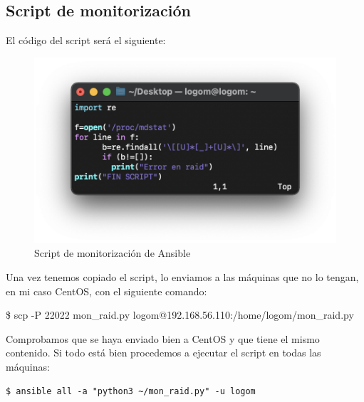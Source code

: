 \subsection{Script de monitorización}
El código del script será el siguiente:
    \begin{figure}[H]
        \centering
        \includegraphics[scale=0.5]{images/mon_raid.png}
        \caption{Script de monitorización de Ansible}
        \label{fig:mon_raid}
    \end{figure}

Una vez tenemos copiado el script, lo enviamos a las máquinas que no lo tengan, en mi caso CentOS, con el siguiente comando:
    \begin{tcolorbox}[colback=black!10, halign=left]
        \$ scp -P 22022 mon\_raid.py logom@192.168.56.110:/home/logom/mon\_raid.py
    \end{tcolorbox}

Comprobamos que se haya enviado bien a CentOS y que tiene el mismo contenido. Si todo está bien procedemos a ejecutar el script en todas las máquinas:
    \begin{tcolorbox}[colback=black!10, halign=left]
        \begin{verbatim}$ ansible all -a "python3 ~/mon_raid.py" -u logom \end{verbatim}
    \end{tcolorbox}

